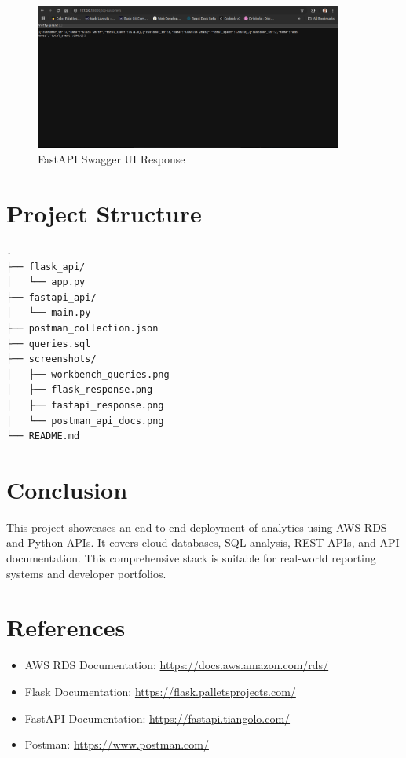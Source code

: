 \documentclass[12pt]{article}
\begin{document}
\begin{figure}[H]
\centering
\includegraphics[width=0.9\textwidth]{screenshots/fastapi_response.png}
\caption{FastAPI Swagger UI Response}
\end{figure}

\section{Project Structure}
\begin{lstlisting}
.
├── flask_api/
│   └── app.py
├── fastapi_api/
│   └── main.py
├── postman_collection.json
├── queries.sql
├── screenshots/
│   ├── workbench_queries.png
│   ├── flask_response.png
│   ├── fastapi_response.png
│   └── postman_api_docs.png
└── README.md
\end{lstlisting}

\section{Conclusion}
This project showcases an end-to-end deployment of analytics using AWS RDS and Python APIs. It covers cloud databases, SQL analysis, REST APIs, and API documentation. This comprehensive stack is suitable for real-world reporting systems and developer portfolios.

\section{References}
\begin{itemize}
    \item AWS RDS Documentation: \url{https://docs.aws.amazon.com/rds/}
    \item Flask Documentation: \url{https://flask.palletsprojects.com/}
    \item FastAPI Documentation: \url{https://fastapi.tiangolo.com/}
    \item Postman: \url{https://www.postman.com/}
\end{itemize}
\end{document}
